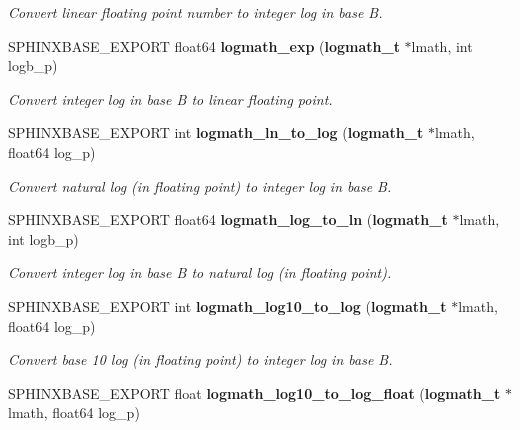 \begin{DoxyCompactItemize}
\begin{DoxyCompactList}\small\item\em Convert linear floating point number to integer log in base B. \end{DoxyCompactList}\item 
S\-P\-H\-I\-N\-X\-B\-A\-S\-E\-\_\-\-E\-X\-P\-O\-R\-T float64 {\bf logmath\-\_\-exp} ({\bf logmath\-\_\-t} $\ast$lmath, int logb\-\_\-p)\label{logmath_8h_ae8b0a168e29e448c0d6de66dc46e099e}

\begin{DoxyCompactList}\small\item\em Convert integer log in base B to linear floating point. \end{DoxyCompactList}\item 
S\-P\-H\-I\-N\-X\-B\-A\-S\-E\-\_\-\-E\-X\-P\-O\-R\-T int {\bf logmath\-\_\-ln\-\_\-to\-\_\-log} ({\bf logmath\-\_\-t} $\ast$lmath, float64 log\-\_\-p)\label{logmath_8h_a52eff2c778ad758888b03ac5efcdccea}

\begin{DoxyCompactList}\small\item\em Convert natural log (in floating point) to integer log in base B. \end{DoxyCompactList}\item 
S\-P\-H\-I\-N\-X\-B\-A\-S\-E\-\_\-\-E\-X\-P\-O\-R\-T float64 {\bf logmath\-\_\-log\-\_\-to\-\_\-ln} ({\bf logmath\-\_\-t} $\ast$lmath, int logb\-\_\-p)\label{logmath_8h_a8035e176636eae8b4e02fe488f25457a}

\begin{DoxyCompactList}\small\item\em Convert integer log in base B to natural log (in floating point). \end{DoxyCompactList}\item 
S\-P\-H\-I\-N\-X\-B\-A\-S\-E\-\_\-\-E\-X\-P\-O\-R\-T int {\bf logmath\-\_\-log10\-\_\-to\-\_\-log} ({\bf logmath\-\_\-t} $\ast$lmath, float64 log\-\_\-p)\label{logmath_8h_aacb4dddeed63a61fb927915f7e3a642e}

\begin{DoxyCompactList}\small\item\em Convert base 10 log (in floating point) to integer log in base B. \end{DoxyCompactList}\item 
S\-P\-H\-I\-N\-X\-B\-A\-S\-E\-\_\-\-E\-X\-P\-O\-R\-T float {\bf logmath\-\_\-log10\-\_\-to\-\_\-log\-\_\-float} ({\bf logmath\-\_\-t} $\ast$lmath, float64 log\-\_\-p)\label{logmath_8h_a319ff7b55b6fca55e432ac8e85c368db}


\end{DoxyCompactItemize}
